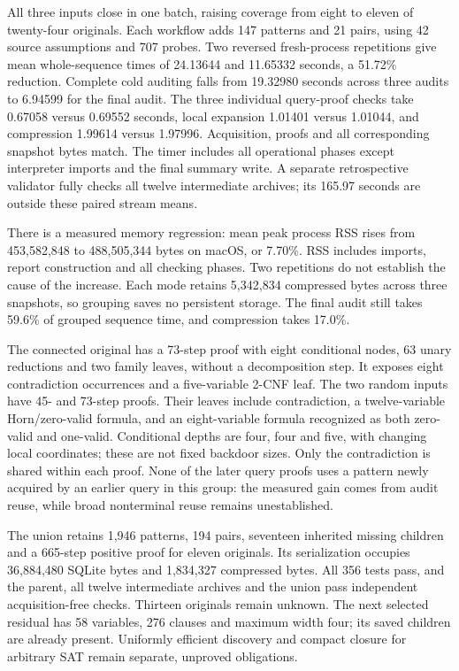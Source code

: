 \documentclass[11pt,a4paper]{article}
\numberwithin{equation}{section}
\theoremstyle{plain}
\theoremstyle{definition}
\theoremstyle{remark}
\begin{document}
All three inputs close in one batch, raising coverage from eight to eleven of
twenty-four originals. Each workflow adds 147 patterns and 21 pairs, using 42
source assumptions and 707 probes. Two reversed fresh-process repetitions give
mean whole-sequence times of 24.13644 and 11.65332 seconds, a 51.72\% reduction.
Complete cold auditing falls from 19.32980 seconds across three audits to 6.94599
for the final audit. The three individual query-proof checks take 0.67058 versus
0.69552 seconds, local expansion 1.01401 versus 1.01044, and compression 1.99614
versus 1.97996. Acquisition, proofs and all corresponding snapshot bytes match.
The timer includes all operational phases except interpreter imports and the
final summary write. A separate retrospective validator fully checks all twelve
intermediate archives; its 165.97 seconds are outside these paired stream means.

There is a measured memory regression: mean peak process RSS rises from
453,582,848 to 488,505,344 bytes on macOS, or 7.70\%. RSS includes imports, report
construction and all checking phases. Two repetitions do not establish the
cause of the increase. Each mode retains 5,342,834 compressed bytes across three
snapshots, so grouping saves no persistent storage. The final audit still takes
59.6\% of grouped sequence time, and compression takes 17.0\%.

The connected original has a 73-step proof with eight conditional nodes,
63 unary reductions and two family leaves, without a decomposition step. It
exposes eight contradiction occurrences and a five-variable 2-CNF leaf. The two
random inputs have 45- and 73-step proofs. Their leaves include contradiction,
a twelve-variable Horn/zero-valid formula, and an eight-variable formula recognized
as both zero-valid and one-valid. Conditional depths are four, four and five,
with changing local coordinates; these are not fixed backdoor sizes. Only the
contradiction is shared within each proof. None of the later query proofs uses
a pattern newly acquired by an earlier query in this group: the measured gain
comes from audit reuse, while broad nonterminal reuse remains unestablished.

The union retains 1,946 patterns, 194 pairs, seventeen inherited missing children
and a 665-step positive proof for eleven originals. Its serialization occupies
36,884,480 SQLite bytes and 1,834,327 compressed bytes. All 356 tests pass, and
the parent, all twelve intermediate archives and the union pass independent
acquisition-free checks. Thirteen originals remain unknown. The next selected
residual has 58 variables, 276 clauses and maximum width four; its saved children
are already present. Uniformly efficient discovery and compact closure for
arbitrary SAT remain separate, unproved obligations.
\end{document}
